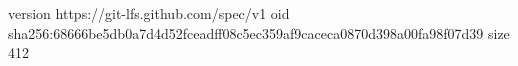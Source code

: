 version https://git-lfs.github.com/spec/v1
oid sha256:68666be5db0a7d4d52fceadff08c5ec359af9caceca0870d398a00fa98f07d39
size 412
